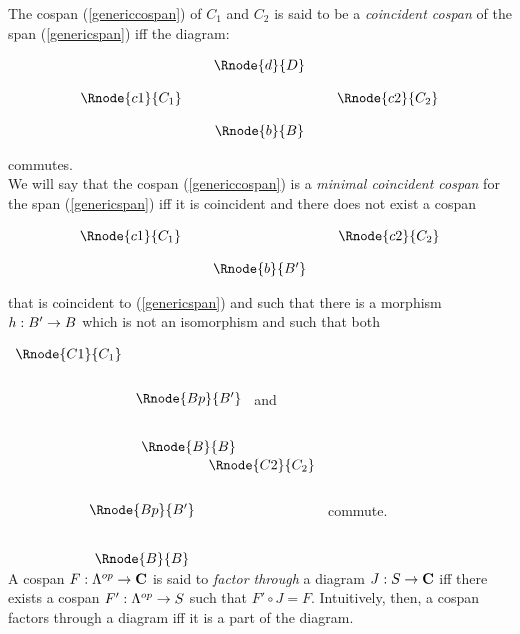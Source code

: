 \documentclass[10pt,a4paper]{scrartcl}
\begin{document}
\noindent
The cospan (\ref{genericcospan}) of $C_1$ and $C_2$ is said to be a 
\textit{coincident cospan} of the span (\ref{genericspan}) iff the 
diagram:
\begin{center}
\begin{equation}
\begin{array}{cp{0.1cm}cp{0.1cm} c}
            & &\Rnode{d}{D}                           \\ [0.4cm]
\Rnode{c1}{C_1}& &                & & \Rnode{c2}{C_2} \\ [0.4cm]
            & &\Rnode{b}{B}
\end{array}
\end{equation}
\end{center}

\noindent commutes. \\

\noindent We will say that the cospan (\ref{genericcospan}) is a 
\textit{minimal coincident cospan} for the span (\ref{genericspan}) iff it is 
coincident  and there does not exist a cospan 
\begin{center}
\begin{equation}
\begin{array}{cp{0.1cm}cp{0.1cm} c}
\Rnode{c1}{C_1}& &                & & \Rnode{c2}{C_2} \\ [0.4cm]
            & &\Rnode{b}{B'}
\end{array}
\end{equation}
\end{center}

\noindent
that is coincident to (\ref{genericspan}) and such that there is a morphism 
$h: B' \rightarrow B$ which is not an isomorphism and such that both \\
\vspace {0.25cm}

$
\begin{array}{cc}
\Rnode{C1}{C_1}                             \\ [0.7cm]
               & \Rnode{Bp}{B'}             \\ [0.8cm]
							 &  \Rnode{B}{B} 
\end{array}
$
and
$
\begin{array}{p{1.5cm}cc}
&                &\Rnode{C2}{C_2}     \\ [0.7cm]
&\Rnode{Bp}{B'}                       \\ [0.8cm]
&\Rnode{B}{B}
\end{array}
$
commute. \\
\noindent
A cospan $F:\Lambda^{op} \rightarrow \textbf{C}$ is said to \textit{factor through}  a diagram 
$J:S \rightarrow \textbf{C}$ iff there exists a cospan $F': \Lambda^{op} \rightarrow S$ 
such that $F' \circ J = F$. Intuitively, then, a cospan factors through a diagram iff it is a 
part of the diagram.
  
\end{document}
